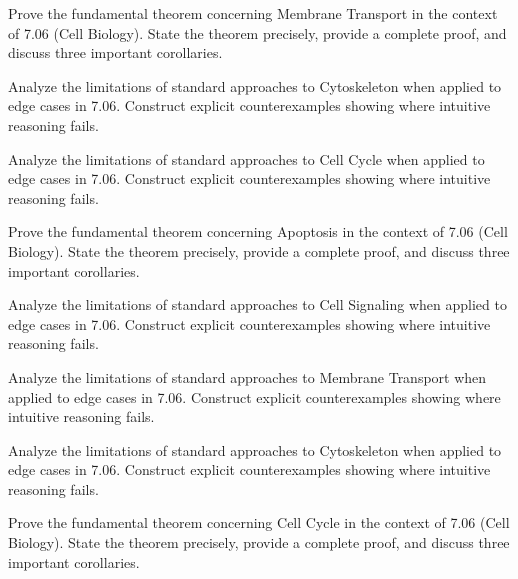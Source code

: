 \documentclass[12pt,a4paper]{exam}
\begin{document}
\begin{questions}

\question[5]
Prove the fundamental theorem concerning Membrane Transport in the context of 7.06 (Cell Biology). State the theorem precisely, provide a complete proof, and discuss three important corollaries.

\vspace{0.3cm}

\question[5]
Analyze the limitations of standard approaches to Cytoskeleton when applied to edge cases in 7.06. Construct explicit counterexamples showing where intuitive reasoning fails.

\vspace{0.3cm}

\question[4]
Analyze the limitations of standard approaches to Cell Cycle when applied to edge cases in 7.06. Construct explicit counterexamples showing where intuitive reasoning fails.

\vspace{0.3cm}

\question[3]
Prove the fundamental theorem concerning Apoptosis in the context of 7.06 (Cell Biology). State the theorem precisely, provide a complete proof, and discuss three important corollaries.

\vspace{0.3cm}

\question[4]
Analyze the limitations of standard approaches to Cell Signaling when applied to edge cases in 7.06. Construct explicit counterexamples showing where intuitive reasoning fails.

\vspace{0.3cm}

\question[5]
Analyze the limitations of standard approaches to Membrane Transport when applied to edge cases in 7.06. Construct explicit counterexamples showing where intuitive reasoning fails.

\vspace{0.3cm}

\question[8]
Analyze the limitations of standard approaches to Cytoskeleton when applied to edge cases in 7.06. Construct explicit counterexamples showing where intuitive reasoning fails.

\vspace{0.3cm}

\question[2]
Prove the fundamental theorem concerning Cell Cycle in the context of 7.06 (Cell Biology). State the theorem precisely, provide a complete proof, and discuss three important corollaries.


\end{questions}
\end{document}

